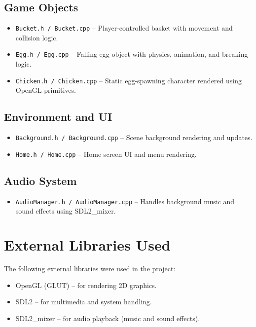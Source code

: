 \documentclass[12pt,a4paper]{report}
\begin{document}
\subsection{Game Objects}
\begin{itemize}
    \item \texttt{Bucket.h / Bucket.cpp} – Player-controlled basket with movement and collision logic.
    \item \texttt{Egg.h / Egg.cpp} – Falling egg object with physics, animation, and breaking logic.
    \item \texttt{Chicken.h / Chicken.cpp} – Static egg-spawning character rendered using OpenGL primitives.
\end{itemize}

\subsection{Environment and UI}
\begin{itemize}
    \item \texttt{Background.h / Background.cpp} – Scene background rendering and updates.
    \item \texttt{Home.h / Home.cpp} – Home screen UI and menu rendering.
\end{itemize}

\subsection{Audio System}
\begin{itemize}
    \item \texttt{AudioManager.h / AudioManager.cpp} – Handles background music and sound effects using SDL2\_mixer.
\end{itemize}

\section{External Libraries Used}

The following external libraries were used in the project:

\begin{itemize}
    \item OpenGL (GLUT) – for rendering 2D graphics.
    \item SDL2 – for multimedia and system handling.
    \item SDL2\_mixer – for audio playback (music and sound effects).
\end{itemize}
\end{document}
